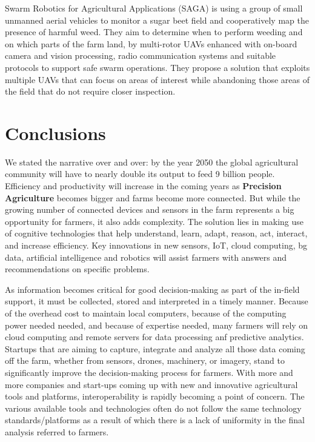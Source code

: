 \documentclass[review]{elsarticle}
\begin{document}
    Swarm Robotics for Agricultural Applications (SAGA) is using a group of small unmanned aerial vehicles  to monitor a sugar beet field and cooperatively map the presence of harmful weed. They aim to determine when to perform weeding and on which parts of the farm land, by multi-rotor UAVs  enhanced with on-board camera and vision processing, radio communication systems and suitable protocols to support safe swarm operations. They propose a solution that exploits multiple UAVs that can focus on areas of interest while abandoning those areas of the field that do not require closer inspection.

\section{Conclusions}
We stated the narrative over and over: by the year 2050 the global agricultural community will have to nearly double its output to feed 9 billion people. Efficiency and productivity will increase in the coming years as \textbf{Precision Agriculture} becomes bigger and farms become more connected. But while the growing number of connected devices and sensors in the farm represents a big opportunity for farmers, it also adds complexity. The solution lies in making use of cognitive technologies that help understand, learn, adapt, reason, act, interact, and increase efficiency. Key innovations in new sensors, IoT, cloud computing, bg data, artificial intelligence and robotics will assist farmers with answers and recommendations on specific problems.

As information becomes critical for good decision-making as part of the in-field support, it must be collected, stored and interpreted in a timely manner. Because of the overhead cost to maintain local computers, because of the computing power needed needed, and because of expertise needed, many farmers will rely on cloud computing and remote servers for data processing anf predictive analytics. Startups that are aiming to capture, integrate and analyze all those data coming off the farm, whether from sensors, drones, machinery, or imagery, stand to significantly improve the decision-making process for farmers. With more and more companies and start-ups coming up with new and innovative agricultural tools and platforms, interoperability is rapidly becoming a point of concern. The various available tools and technologies often do not follow the same technology standards/platforms as a result of which there is a lack of uniformity in the final analysis referred to farmers.
\end{document}
